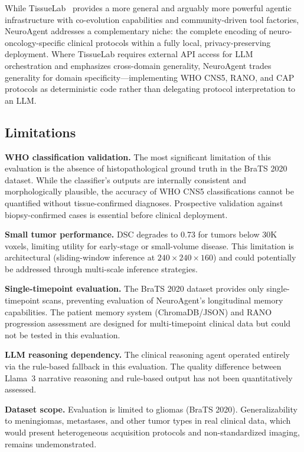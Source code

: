 While TissueLab~\cite{tissuelab2025} provides a more general and arguably more powerful agentic infrastructure with co-evolution capabilities and community-driven tool factories, NeuroAgent addresses a complementary niche: the complete encoding of neuro-oncology-specific clinical protocols within a fully local, privacy-preserving deployment. Where TissueLab requires external API access for LLM orchestration and emphasizes cross-domain generality, NeuroAgent trades generality for domain specificity---implementing WHO CNS5, RANO, and CAP protocols as deterministic code rather than delegating protocol interpretation to an LLM.

\subsection{Limitations}

\textbf{WHO classification validation.} The most significant limitation of this evaluation is the absence of histopathological ground truth in the BraTS 2020 dataset. While the classifier's outputs are internally consistent and morphologically plausible, the accuracy of WHO CNS5 classifications cannot be quantified without tissue-confirmed diagnoses. Prospective validation against biopsy-confirmed cases is essential before clinical deployment.

\textbf{Small tumor performance.} DSC degrades to 0.73 for tumors below 30K voxels, limiting utility for early-stage or small-volume disease. This limitation is architectural (sliding-window inference at $240 \times 240 \times 160$) and could potentially be addressed through multi-scale inference strategies.

\textbf{Single-timepoint evaluation.} The BraTS 2020 dataset provides only single-timepoint scans, preventing evaluation of NeuroAgent's longitudinal memory capabilities. The patient memory system (ChromaDB/JSON) and RANO progression assessment are designed for multi-timepoint clinical data but could not be tested in this evaluation.

\textbf{LLM reasoning dependency.} The clinical reasoning agent operated entirely via the rule-based fallback in this evaluation. The quality difference between Llama~3 narrative reasoning and rule-based output has not been quantitatively assessed.

\textbf{Dataset scope.} Evaluation is limited to gliomas (BraTS 2020). Generalizability to meningiomas, metastases, and other tumor types in real clinical data, which would present heterogeneous acquisition protocols and non-standardized imaging, remains undemonstrated.

